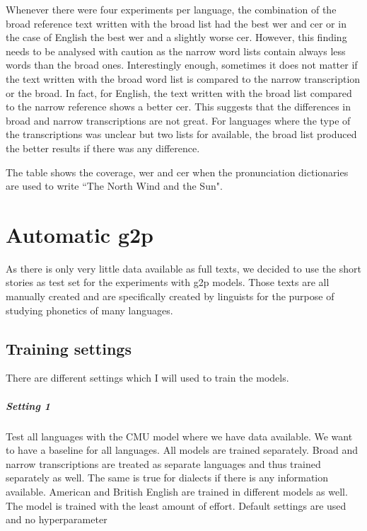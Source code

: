 Whenever there were four experiments per language, the combination of the broad reference text written with the broad list had the best \ac{wer} and \ac{cer} or in the case of English the best \ac{wer} and a slightly worse \ac{cer}. However, this finding needs to be analysed with caution as the narrow word lists contain always less words than the broad ones. Interestingly enough, sometimes it does not matter if the text written with the broad word list is compared to the narrow transcription or the broad. In fact, for English, the text written with the broad list compared to the narrow reference shows a better \ac{cer}. This suggests that the differences in broad and narrow transcriptions are not great.
For languages where the type of the transcriptions was unclear but two lists for available, the broad list produced the better results if there was any difference. 



\begin{table}[h!]
\begin{center}
\caption[Coverage of Pronunciation Dictionaries]{The table shows the coverage, \ac{wer} and \ac{cer} when the pronunciation dictionaries are used to write ``The North Wind and the Sun".}
\label{tab:coverage}
\end{center}
\end{table}

\section{Automatic \ac{g2p}}
As there is only very little data available as full texts, we decided to use the short stories as test set for the experiments with \ac{g2p} models. Those texts are all manually created and are specifically created by linguists for the purpose of studying phonetics of many languages. 

\subsection{Training settings}
There are different settings which I will used to train the models.

\subparagraph{Setting 1}
Test all languages with the CMU model where we have data available. We want to have a baseline for all languages. All models are trained separately. Broad and narrow transcriptions are treated as separate languages and thus trained separately as well. The same is true for dialects if there is any information available. American and British English are trained in different models as well. The model is trained with the least amount of effort. Default settings are used and no hyperparameter

